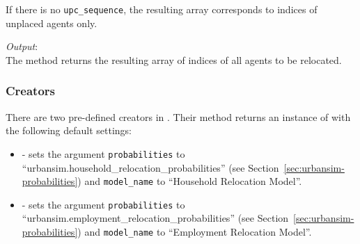 If there is no \verb|upc_sequence|,
the resulting array corresponds to indices of unplaced agents only. 

{\it Output}:~\\[1mm]
The method returns the resulting array of indices of all agents to be
relocated.

%
\subsubsection{Creators}
%
There are two pre-defined creators in . Their method
 returns an instance of
 with the following default settings:
\begin{itemize}
\item {} - sets the argument
  \verb|probabilities| to ``urbansim.household_relocation_probabilities''
  (see Section~\ref{sec:urbansim-probabilities}) and \verb|model_name| to
  ``Household Relocation Model''.
\item {} - sets the argument
  \verb|probabilities| to
  ``urbansim.employment_relocation_probabilities'' (see
  Section~\ref{sec:urbansim-probabilities}) and \verb|model_name| to
  ``Employment Relocation Model''. 
\end{itemize}

%
